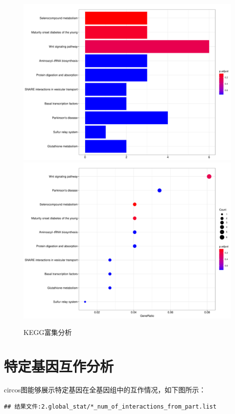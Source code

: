 \documentclass[
]{ctexart}
\begin{document}
\begin{figure}[H]

{\centering \includegraphics[width=0.48\linewidth]{./1.picture/eRNA_for_cluster_geneKEGGbar} \includegraphics[width=0.48\linewidth]{./1.picture/eRNA_for_cluster_geneKEGGdot} 

}

\caption{KEGG富集分析}\label{fig:unnamed-chunk-19}
\end{figure}

\hypertarget{ux7279ux5b9aux57faux56e0ux4e92ux4f5cux5206ux6790}{%
\section{特定基因互作分析}\label{ux7279ux5b9aux57faux56e0ux4e92ux4f5cux5206ux6790}}

circos图能够展示特定基因在全基因组中的互作情况，如下图所示：

\begin{verbatim}
## 结果文件:2.global_stat/*_num_of_interactions_from_part.list
\end{verbatim}
\end{document}

